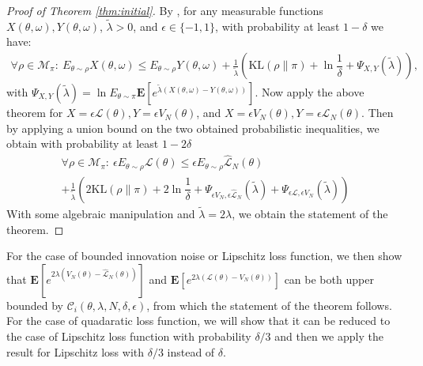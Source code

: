 \documentclass{article}
\newcommand{\KL}{\mathrm{KL}}
\renewcommand{\KL}{\mathrm{KL}}
\newcommand{\bE}{\mathbf{E}}
\begin{document}
\begin{proof}[Proof of Theorem \ref{thm:initial}]
    By \cite[Theorem 3]{nips-16}, for any measurable functions $X(\theta,\omega),Y(\theta,\omega)$,  $\tilde{\lambda}>0$, and $\epsilon \in \{-1,1\}$, with probability at least $1-\delta$ we have:
    \begin{multline}
        \forall \rho\in \mathcal{M}_{\pi}:\ E_{\theta\sim\rho}X(\theta,\omega)
        \leq E_{\theta\sim\rho}Y(\theta,\omega)+ \frac{1}{\tilde{\lambda}}\left (\KL(\rho\|\pi)+\ln\dfrac{1}{\delta}+ \Psi_{X,Y}(\tilde{\lambda}) \right ),
        \label{pf:thm:initial:eq1}
    \end{multline}
    with $\Psi_{X,Y}(\tilde{\lambda})=\ln E_{\theta\sim\pi}\bE[e^{\tilde{\lambda}(X(\theta,\omega)-Y(\theta,\omega))}]$.
    Now apply the above theorem for $X=\epsilon \mathcal{L}(\theta),Y=\epsilon V_N(\theta)$, and $X=\epsilon V_N(\theta),Y=\epsilon \hat{\mathcal{L}}_N(\theta)$. Then by applying a union bound on the two obtained probabilistic inequalities, we obtain with probability at least $1-2\delta$
    \begin{multline*}
        \forall \rho \in \mathcal{M}_{\pi}:\ \epsilon E_{\theta\sim\rho}\mathcal{L}(\theta)\leq \epsilon  E_{\theta\sim\rho}\hat{\mathcal{L}}_N(\theta)\\
        + \frac{1}{\tilde{\lambda}}\left (2\KL(\rho\|\pi)+2\ln\dfrac{1}{\delta}+ \Psi_{\epsilon V_N, \epsilon \hat{\mathcal{L}}_N}(\tilde{\lambda}) +\Psi_{\epsilon \mathcal{L},\epsilon V_N}(\tilde{\lambda})
        \right ) 
    \end{multline*}
     With some algebraic manipulation and $\tilde{\lambda}=2\lambda$, we obtain the statement of the theorem. 
\end{proof}
For the case of bounded innovation noise or Lipschitz loss function, we
then show that $\bE[e^{2\lambda(V_N(\theta)-\hat{\mathcal{L}}_N(\theta))}]$
and $\bE[e^{2\lambda (\mathcal{L}(\theta)-V_N(\theta))}]$ can be both upper bounded by
$\mathcal{C}_i(\theta,\lambda,N,\delta,\epsilon)$, from which the statement of the theorem follows.
For the case of quadaratic loss function, we will show that it can be reduced to the case of Lipschitz loss function
with probability $\delta/3$ and then we apply the result for Lipschitz loss with $\delta/3$ instead of $\delta$.
\end{document}
